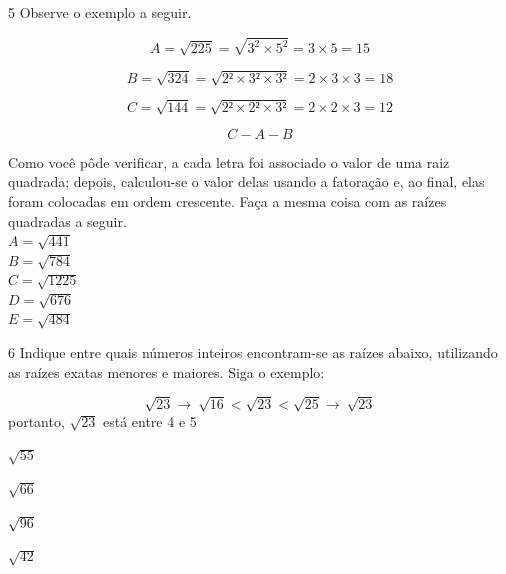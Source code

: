 \num{5} Observe o exemplo a seguir. 

$$A = \sqrt{225} = \sqrt{3^{2} \times 5^{2}} = 3 \times 5 = 15$$

$$B = \sqrt{324} = \sqrt{2² \times 3² \times 3²} = 2 \times 3 \times 3 = 18$$

$$C = \sqrt{144} = \sqrt{2² \times 2² \times 3²} = 2 \times 2 \times 3 = 12$$

$$C - A - B$$

Como você pôde verificar, a cada letra foi associado o valor de uma raiz quadrada; depois, calculou-se
o valor delas usando a fatoração e, ao final, elas foram colocadas em ordem crescente. Faça a mesma
coisa com as raízes quadradas a seguir. \\

$A = \sqrt{441}$  \\

$B = \sqrt{784}$  \\

$C = \sqrt{1225}$  \\

$D = \sqrt{676}$  \\

$E = \sqrt{484}$  \\


\num{6} Indique entre quais números inteiros encontram-se as raízes abaixo,
utilizando as raízes exatas menores e maiores. Siga o exemplo:

$$\sqrt{23} \rightarrow \ \sqrt{16} < \sqrt{23} < \sqrt{25} \rightarrow \
\sqrt{23}$$ {portanto, $\sqrt{23}$ está entre 4 e 5}

\begin{escolha}
    \item $\sqrt{55}$   

    \item $\sqrt{66}$ 

    \item $\sqrt{96}$ 

    \item $\sqrt{42}$ 
\end{escolha}


